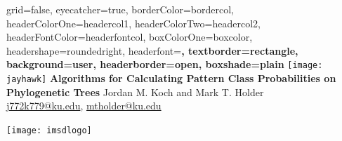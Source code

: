 \documentclass[a0paper,landscape]{baposter}
\begin{document}

\background{
}

\begin{poster}{
	grid=false,
	eyecatcher=true, 
	borderColor=bordercol,
	headerColorOne=headercol1,
	headerColorTwo=headercol2,
	headerFontColor=headerfontcol,
	boxColorOne=boxcolor,
	headershape=roundedright,
	headerfont=\Large\sf\bf,
	textborder=rectangle,
	background=user,
	headerborder=open,
  boxshade=plain
}
{
\texttt{[image: jayhawk]}
}
{\bf
	Algorithms for Calculating Pattern Class Probabilities on Phylogenetic Trees
}
{
	\vspace{1em} Jordan M. Koch and Mark T. Holder\\
	{\smaller \url{j772k779@ku.edu}, \url{mtholder@ku.edu}}
}
{

\setlength\fboxsep{0pt}
\setlength\fboxrule{0.5pt}
			\texttt{[image: imsdlogo]}
}


\end{poster}
\end{document}
